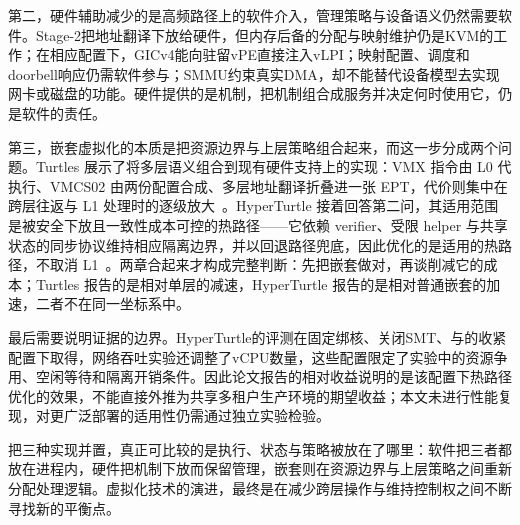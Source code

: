 第二，硬件辅助减少的是高频路径上的软件介入，管理策略与设备语义仍然需要软件。Stage-2把地址翻译下放给硬件，但内存后备的分配与映射维护仍是KVM的工作；在相应配置下，GICv4能向驻留vPE直接注入vLPI；映射配置、调度和doorbell响应仍需软件参与；SMMU约束真实DMA，却不能替代设备模型去实现网卡或磁盘的功能\cite{source4,source9,source10}。硬件提供的是机制，把机制组合成服务并决定何时使用它，仍是软件的责任。

第三，嵌套虚拟化的本质是把资源边界与上层策略组合起来，而这一步分成两个问题。Turtles 展示了将多层语义组合到现有硬件支持上的实现：VMX 指令由 L0 代执行、VMCS02 由两份配置合成、多层地址翻译折叠进一张 EPT，代价则集中在跨层往返与 L1 处理时的逐级放大~\cite{source7}。HyperTurtle 接着回答第二问，其适用范围是被安全下放且一致性成本可控的热路径——它依赖 verifier、受限 helper 与共享状态的同步协议维持相应隔离边界，并以回退路径兜底，因此优化的是适用的热路径，不取消 L1~\cite{source8}。两章合起来才构成完整判断：先把嵌套做对，再谈削减它的成本；Turtles 报告的是相对单层的减速，HyperTurtle 报告的是相对普通嵌套的加速，二者不在同一坐标系中。

最后需要说明证据的边界。HyperTurtle的评测在固定绑核、关闭SMT、与的收紧配置下取得，网络吞吐实验还调整了vCPU数量，这些配置限定了实验中的资源争用、空闲等待和隔离开销条件\cite{source8}。因此论文报告的相对收益说明的是该配置下热路径优化的效果，不能直接外推为共享多租户生产环境的期望收益；本文未进行性能复现，对更广泛部署的适用性仍需通过独立实验检验。

把三种实现并置，真正可比较的是执行、状态与策略被放在了哪里：软件把三者都放在进程内，硬件把机制下放而保留管理，嵌套则在资源边界与上层策略之间重新分配处理逻辑。虚拟化技术的演进，最终是在减少跨层操作与维持控制权之间不断寻找新的平衡点。
